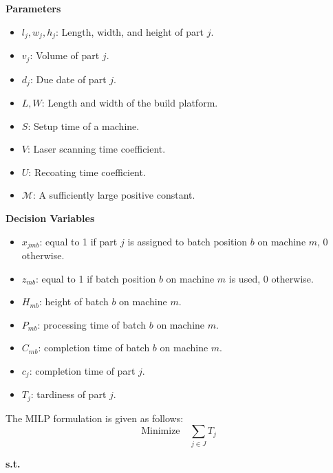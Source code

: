 \documentclass[review,3p,times,authoryear]{elsarticle}
\begin{document}
\noindent \textbf{Parameters}
\begin{itemize}
	\item $l_j, w_j, h_j$: Length, width, and height of part $j$.
	\item $v_j$: Volume of part $j$.
	\item $d_j$: Due date of part $j$.
	\item $L, W$: Length and width of the build platform.
	\item $S$: Setup time of a machine.
	\item $V$: Laser scanning time coefficient.
	\item $U$: Recoating time coefficient.
	\item $\mathcal{M}$: A sufficiently large positive constant.
\end{itemize}

\noindent \textbf{Decision Variables}
\begin{itemize}
	\item $x_{jmb}$: equal to 1 if part $j$ is assigned to batch position $b$ on machine $m$, 0 otherwise.
	\item $z_{mb}$: equal to 1 if batch position $b$ on machine $m$ is used, 0 otherwise.
	\item $H_{mb}$: height of batch $b$ on machine $m$.
	\item $P_{mb}$: processing time of batch $b$ on machine $m$.
	\item $C_{mb}$: completion time of batch $b$ on machine $m$.
	\item $c_j$: completion time of part $j$.
	\item $T_j$: tardiness of part $j$.
\end{itemize}

The MILP formulation is given as follows:
\begin{equation}
	\text{Minimize} \quad \sum_{j \in J} T_j
	\label{obj_pm}
\end{equation}

\noindent \textbf{s.t.}
\end{document}

